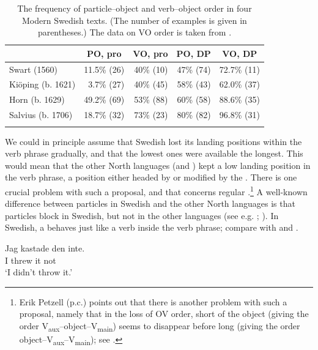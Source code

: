 \documentclass[output=paper]{langscibook}
\begin{document}
\begin{table}
\caption{The frequency of particle–object and verb–object order in four Modern Swedish texts. (The number of examples is given in parentheses.) The data on VO order is taken from \citet{Petzell2012}.\label{tab:lalu:3}}
\begin{tabular}{lrrrr}
\lsptoprule
& \multicolumn{1}{c}{PO, pro} & \multicolumn{1}{c}{VO, pro} & \multicolumn{1}{c}{PO, DP} & \multicolumn{1}{c}{VO, DP}\\\midrule
Swart (1560) & 11.5\% (26) & 40\% (10) & 47\% (74) & 72.7\% (11)\\
Kiöping (b. 1621) & 3.7\% (27) & 40\% (45) & 58\% (43) & 62.0\%   (37)\\
Horn (b. 1629) & 49.2\%   (69) & 53\%   (88) & 60\% (58) & 88.6\% (35)\\
Salvius (b. 1706) & 18.7\% (32) & 73\% (23) & 80\% (82) & 96.8\% (31)\\
\lspbottomrule
\end{tabular}
\end{table}

We could in principle assume that Swedish lost its landing positions within the verb phrase gradually, and that the lowest ones were available the longest. This would mean that the other North  languages (and ) kept a low landing position in the verb phrase, a position either headed by or modified by the . There is one crucial problem with such a proposal, and that concerns regular .\footnote{Erik Petzell (p.c.) points out that there is another problem with such a proposal, namely that in the loss of OV order, short  of the object (giving the order V\textsubscript{aux}–object--V\textsubscript{main}) seems to disappear before long  (giving the order object--V\textsubscript{aux}–V\textsubscript{main}); see \citet{Petzell2012}.} A well-known difference between particles in Swedish and the other North  languages is that particles block  in Swedish, but not in the other languages (see e.g. \citealt{Holmberg1986}; \citealt{Sells1998}). In Swedish, a  behaves just like a verb inside the verb phrase; compare  with  and .


\ea\label{ex:lalu:47}
\ea\label{ex:lalu:47a}
\gll  Jag   kastade   den   inte.\\
 I       threw   it     not\\
\glt `I didn’t throw it.'
\end{document}
